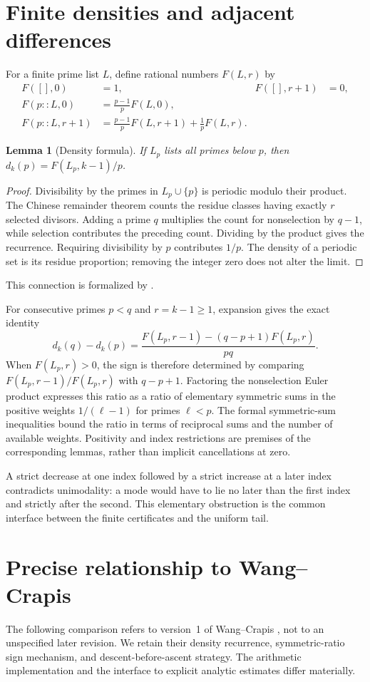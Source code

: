 \documentclass[11pt]{amsart}
\newtheorem{lemma}[theorem]{Lemma}
\theoremstyle{definition}
\newcommand{\code}[1]{\path{#1}}
\begin{document}
\section{Finite densities and adjacent differences}
For a finite prime list $L$, define rational numbers $F(L,r)$ by
\[
\begin{aligned}
 F([],0)&=1,& F([],r+1)&=0,\\
 F(p::L,0)&=\frac{p-1}{p}F(L,0),\\
 F(p::L,r+1)&=\frac{p-1}{p}F(L,r+1)+\frac1pF(L,r).
\end{aligned}
\]
\begin{lemma}[Density formula]
If $L_p$ lists all primes below $p$, then
$d_k(p)=F(L_p,k-1)/p$.
\end{lemma}
\begin{proof}
Divisibility by the primes in $L_p\cup\{p\}$ is periodic modulo their
product. The Chinese remainder theorem counts the residue classes having
exactly $r$ selected divisors. Adding a prime $q$ multiplies the count for
nonselection by $q-1$, while selection contributes the preceding count.
Dividing by the product gives the recurrence. Requiring divisibility by $p$
contributes $1/p$. The density of a periodic set is its residue proportion;
removing the integer zero does not alter the limit.
\end{proof}
This connection is formalized by
\code{hasNaturalDensity_primeFactorDensity}.

For consecutive primes $p<q$ and $r=k-1\geq1$, expansion gives the exact identity
\[
 d_k(q)-d_k(p)
 =\frac{F(L_p,r-1)-(q-p+1)F(L_p,r)}{pq}.
\]
When $F(L_p,r)>0$, the sign is therefore determined by comparing
$F(L_p,r-1)/F(L_p,r)$ with $q-p+1$.
Factoring the nonselection Euler product expresses this ratio as a ratio
of elementary symmetric sums in the positive weights $1/(\ell-1)$ for
primes $\ell<p$. The formal symmetric-sum inequalities bound the ratio in
terms of reciprocal sums and the number of available weights. Positivity
and index restrictions are premises of the corresponding lemmas, rather
than implicit cancellations at zero.

A strict decrease at one index followed by a strict increase at a later
index contradicts unimodality: a mode would have to lie no later than the
first index and strictly after the second. This elementary obstruction is
the common interface between the finite certificates and the uniform tail.

\section{Precise relationship to Wang--Crapis}\label{sec:comparison}
The following comparison refers to version~1 of Wang--Crapis
\cite[Sections~4--6]{WangCrapis}, not to an unspecified later revision.
We retain their density recurrence, symmetric-ratio sign mechanism, and
descent-before-ascent strategy. The arithmetic implementation and the
interface to explicit analytic estimates differ materially.
\end{document}
